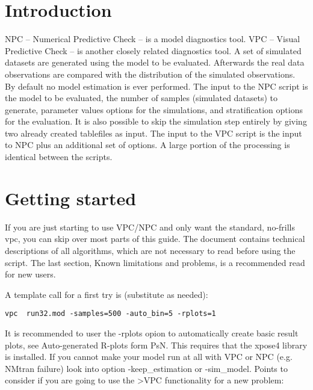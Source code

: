 



\maketitle
\newcommand{\guidetoolname}{vpc}

\section{Introduction}
NPC – Numerical Predictive Check – is a model diagnostics tool. VPC – Visual Predictive Check – is another closely related diagnostics tool. A set of simulated datasets are generated using the model to be evaluated. Afterwards the real data observations are compared with the distribution of the simulated observations. By default no model estimation is ever performed. The input to the NPC script is the model to be evaluated, the number of samples (simulated datasets) to generate, parameter values options for the simulations, and stratification options for the evaluation. It is also possible to skip the simulation step entirely by giving two already created tablefiles as input. The input to the VPC script is the input to NPC plus an additional set of options. A large portion of the processing is identical between the scripts.

\section{Getting started}
If you are just starting to use VPC/NPC and only want the standard, no-frills vpc, you can skip over most parts of this guide. The document contains technical descriptions of all algorithms, which are not necessary to read before using the script. The last section, Known limitations and problems, is a recommended read for new users.

A template call for a first try is (substitute as needed):
\begin{verbatim}
vpc  run32.mod -samples=500 -auto_bin=5 -rplots=1
\end{verbatim}
It is recommended to user the -rplots opion to automatically create basic result plots, see Auto-generated R-plots form PsN. This requires that the xpose4 library is installed. If you cannot make your model run at all with VPC or NPC (e.g. NMtran failure) look into option -keep\_estimation or -sim\_model. Points to consider if you are going to use the >VPC functionality for a new problem:

